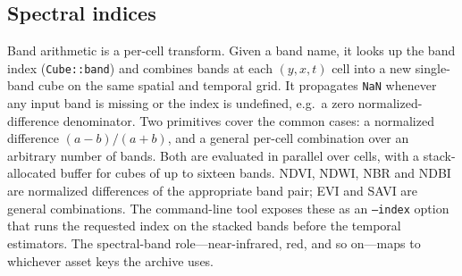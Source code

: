\documentclass[review]{elsarticle}
\begin{document}
\subsection{Spectral indices}
\label{sec:indices}
Band arithmetic is a per-cell transform. Given a band name, it looks up the
band index (\texttt{Cube::band}) and combines bands at each $(y, x, t)$ cell
into a new single-band cube on the same spatial and temporal grid. It
propagates \texttt{NaN} whenever any input band is missing or the index is
undefined, e.g.\ a zero normalized-difference denominator. Two primitives
cover the common cases: a normalized difference $(a-b)/(a+b)$, and a general
per-cell combination over an arbitrary number of bands. Both are evaluated in
parallel over cells, with a stack-allocated buffer for cubes of up to sixteen
bands. NDVI, NDWI, NBR and NDBI are normalized differences of the appropriate
band pair; EVI and SAVI are general combinations. The command-line tool
exposes these as an \texttt{--index} option that runs the requested index on
the stacked bands before the temporal estimators. The spectral-band
role---near-infrared, red, and so on---maps to whichever asset keys the
archive uses.
\end{document}
